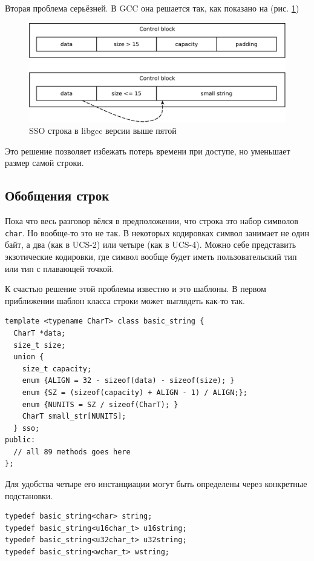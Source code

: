 \documentclass[a4paper,12pt,oneside]{book}
\begin{document}
Вторая проблема серьёзней. В GCC она решается так, как показано на (рис. \ref{fig:string-sso-gcc})

\begin{figure}[ht]
\centering
\includegraphics[width=1.0\textwidth]{illustrations/string-sso-gcc-crop.pdf}
\caption{SSO строка в libgcc версии выше пятой}
\label{fig:string-sso-gcc}
\end{figure}

Это решение позволяет избежать потерь времени при доступе, но уменьшает размер самой строки.

\subsection{Обобщения строк}\label{subsub:strtraits}

Пока что весь разговор вёлся в предположении, что строка это набор символов \lstinline!char!. Но вообще-то это не так. В некоторых кодировках символ занимает не один байт, а два (как в UCS-2) или четыре (как в UCS-4). Можно себе представить экзотические кодировки, где символ вообще будет иметь пользовательский тип или тип с плавающей точкой.

К счастью решение этой проблемы известно и это шаблоны. В первом приближении шаблон класса строки может выглядеть как-то так.

\begin{lstlisting}
template <typename CharT> class basic_string {
  CharT *data;
  size_t size;
  union {
    size_t capacity;
    enum {ALIGN = 32 - sizeof(data) - sizeof(size); }
    enum {SZ = (sizeof(capacity) + ALIGN - 1) / ALIGN;};
    enum {NUNITS = SZ / sizeof(CharT); }
    CharT small_str[NUNITS];
  } sso;
public:
  // all 89 methods goes here
};
\end{lstlisting}

Для удобства четыре его инстанциации могут быть определены через конкретные подстановки.

\begin{lstlisting}
typedef basic_string<char> string;
typedef basic_string<u16char_t> u16string;
typedef basic_string<u32char_t> u32string;
typedef basic_string<wchar_t> wstring;
\end{lstlisting}
\end{document}
